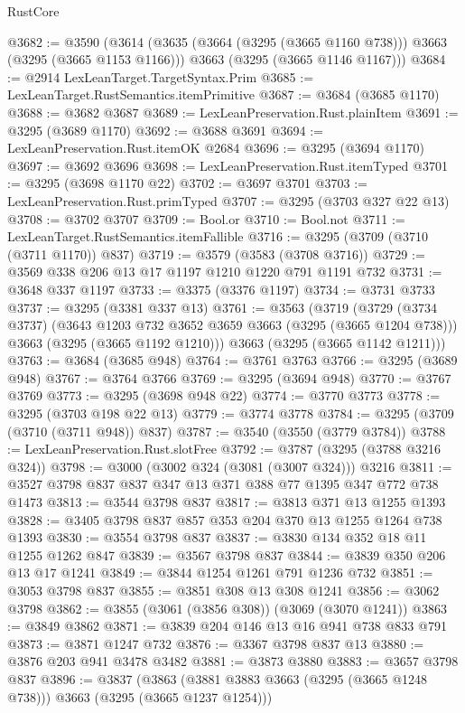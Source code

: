 \begin{lexlean}{RustCore}
\begin{coremodule}
@3682 := @3590
    (@3614
      (@3635 (@3664 (@3295 (@3665 @1160 @738))) @3663 (@3295 (@3665 @1153 @1166)))
      @3663
      (@3295 (@3665 @1146 @1167)))
@3684 := @2914 LexLeanTarget.TargetSyntax.Prim
@3685 := LexLeanTarget.RustSemantics.itemPrimitive
@3687 := @3684 (@3685 @1170)
@3688 := @3682 @3687
@3689 := LexLeanPreservation.Rust.plainItem
@3691 := @3295 (@3689 @1170)
@3692 := @3688 @3691
@3694 := LexLeanPreservation.Rust.itemOK @2684
@3696 := @3295 (@3694 @1170)
@3697 := @3692 @3696
@3698 := LexLeanPreservation.Rust.itemTyped
@3701 := @3295 (@3698 @1170 @22)
@3702 := @3697 @3701
@3703 := LexLeanPreservation.Rust.primTyped
@3707 := @3295 (@3703 @327 @22 @13)
@3708 := @3702 @3707
@3709 := Bool.or
@3710 := Bool.not
@3711 := LexLeanTarget.RustSemantics.itemFallible
@3716 := @3295 (@3709 (@3710 (@3711 @1170)) @837)
@3719 := @3579 (@3583 (@3708 @3716))
@3729 := @3569 @338 @206 @13 @17 @1197 @1210 @1220 @791 @1191 @732
@3731 := @3648 @337 @1197
@3733 := @3375 (@3376 @1197)
@3734 := @3731 @3733
@3737 := @3295 (@3381 @337 @13)
@3761 := @3563
    (@3719
      (@3729
        (@3734 @3737)
        (@3643 @1203 @732 @3652 @3659 @3663 (@3295 (@3665 @1204 @738)))
        @3663
        (@3295 (@3665 @1192 @1210)))
      @3663
      (@3295 (@3665 @1142 @1211)))
@3763 := @3684 (@3685 @948)
@3764 := @3761 @3763
@3766 := @3295 (@3689 @948)
@3767 := @3764 @3766
@3769 := @3295 (@3694 @948)
@3770 := @3767 @3769
@3773 := @3295 (@3698 @948 @22)
@3774 := @3770 @3773
@3778 := @3295 (@3703 @198 @22 @13)
@3779 := @3774 @3778
@3784 := @3295 (@3709 (@3710 (@3711 @948)) @837)
@3787 := @3540 (@3550 (@3779 @3784))
@3788 := LexLeanPreservation.Rust.slotFree
@3792 := @3787 (@3295 (@3788 @3216 @324))
@3798 := @3000 (@3002 @324 (@3081 (@3007 @324))) @3216
@3811 := @3527 @3798 @837 @837 @347 @13 @371 @388 @77 @1395 @347 @772 @738 @1473
@3813 := @3544 @3798 @837
@3817 := @3813 @371 @13 @1255 @1393
@3828 := @3405 @3798 @837 @857 @353 @204 @370 @13 @1255 @1264 @738 @1393
@3830 := @3554 @3798 @837
@3837 := @3830 @134 @352 @18 @11 @1255 @1262 @847
@3839 := @3567 @3798 @837
@3844 := @3839 @350 @206 @13 @17 @1241
@3849 := @3844 @1254 @1261 @791 @1236 @732
@3851 := @3053 @3798 @837
@3855 := @3851 @308 @13 @308 @1241
@3856 := @3062 @3798
@3862 := @3855 (@3061 (@3856 @308)) (@3069 (@3070 @1241))
@3863 := @3849 @3862
@3871 := @3839 @204 @146 @13 @16 @941 @738 @833 @791
@3873 := @3871 @1247 @732
@3876 := @3367 @3798 @837 @13
@3880 := @3876 @203 @941 @3478 @3482
@3881 := @3873 @3880
@3883 := @3657 @3798 @837
@3896 := @3837
    (@3863 (@3881 @3883 @3663 (@3295 (@3665 @1248 @738))) @3663 (@3295 (@3665 @1237 @1254)))

\end{coremodule}
\end{lexlean}
